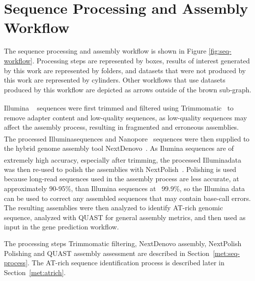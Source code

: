 \section{Sequence Processing and Assembly Workflow}
\label{met:seq-workflow}

The sequence processing and assembly workflow is shown in Figure
\ref{fig:seq-workflow}. Processing steps are represented by boxes,
results of interest generated by this work are represented by folders,
and datasets that were not produced by this work are represented by
cylinders. Other workflows that use datasets produced by this workflow
are depicted as arrows outside of the brown sub-graph.

Illumina\textsuperscript{\textcopyright}\texttrademark
~\cite{bennett2004a} sequences were first trimmed and filtered using
Trimmomatic~\cite{bolger2014a} to remove adapter content and low-quality
sequences, as low-quality sequences may affect the assembly process,
resulting in fragmented and erroneous assemblies. The processed
Illumina\textsuperscript{\textcopyright}\texttrademark sequences and
Nanopore\textsuperscript{\textcopyright}\texttrademark~\cite{wang2021a}
sequences were then supplied to the hybrid genome assembly tool
NextDenovo~\cite{hu2024a}. As Ilumina sequences are of extremely high
accuracy, especially after trimming, the processed
Illumina\textsuperscript{\textcopyright}\texttrademark data was then
re-used to polish the assemblies with
NextPolish~\cite{hu2020a}. Polishing is used because long-read sequences
used in the assembly process are less accurate, at approximately
90-95\%, than Illumina sequences at ~99.9\%, so the Illumina data can
be used to correct any assembled sequences that may contain base-call
errors. The resulting assemblies were then analyzed to identify
AT-rich genomic sequence, analyzed with QUAST for general assembly
metrics, and then used as input in the gene prediction workflow.

The processing steps Trimmomatic filtering, NextDenovo assembly,
NextPolish Polishing and QUAST assembly assessment are described in
Section~\ref{met:seq-process}. The AT-rich sequence identification
process is described later in Section~\ref{met:atrich}.

